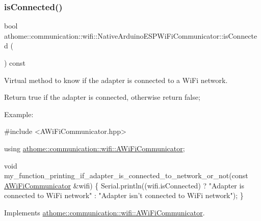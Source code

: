 \subsubsection{\texorpdfstring{is\+Connected()}{isConnected()}}
{\footnotesize\ttfamily bool athome\+::communication\+::wifi\+::\+Native\+Arduino\+E\+S\+P\+Wi\+Fi\+Communicator\+::is\+Connected (\begin{DoxyParamCaption}{ }\end{DoxyParamCaption}) const\hspace{0.3cm}{\ttfamily [virtual]}}

Virtual method to know if the adapter is connected to a Wi\+Fi network.

Return true if the adapter is connected, otherwise return false;

Example\+:


\begin{DoxyCode}
\textcolor{preprocessor}{#include <AWiFiCommunicator.hpp>}

\textcolor{keyword}{using} \mbox{\hyperlink{classathome_1_1communication_1_1wifi_1_1_a_wi_fi_communicator}{athome::communication::wifi::AWiFiCommunicator}};

\textcolor{keywordtype}{void} my\_function\_printing\_if\_adapter\_is\_connected\_to\_network\_or\_not(\textcolor{keyword}{const}
\mbox{\hyperlink{classathome_1_1communication_1_1wifi_1_1_a_wi_fi_communicator_a0098148fe8d0eeee99b7f8f72a72a900}{AWiFiCommunicator}} &wifi) \{ Serial.println((wifi.isConnected) ? \textcolor{stringliteral}{"Adapter is}
\textcolor{stringliteral}{connected to WiFi network"} : \textcolor{stringliteral}{"Adapter isn't connected to WiFi network"});
\}
\end{DoxyCode}
 

Implements \mbox{\hyperlink{classathome_1_1communication_1_1wifi_1_1_a_wi_fi_communicator_a578087d01c814481d89ea702a6d7ed01}{athome\+::communication\+::wifi\+::\+A\+Wi\+Fi\+Communicator}}.

\mbox{\label{classathome_1_1communication_1_1wifi_1_1_native_arduino_e_s_p_wi_fi_communicator_adaa14eb4aa1b147531742c9377aa8db0}} 
